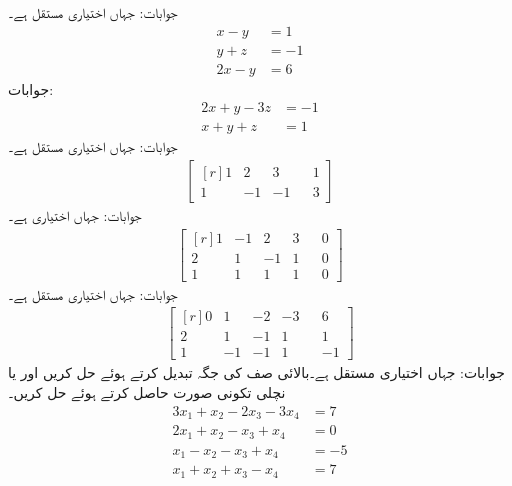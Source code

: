 جوابات:  جہاں  اختیاری مستقل ہے۔
\begin{align*}
x-y&=1\\
y+z&=-1\\
2x-y&=6
\end{align*}
جوابات:
\begin{align*}
2x+y-3z&=-1\\
x+y+z&=1
\end{align*}
جوابات:  جہاں  اختیاری مستقل ہے۔
\begin{align*}
\begin{bmatrix*}[r]
1&2&3&&1\\
1&-1&-1&&3
\end{bmatrix*}
\end{align*}
جوابات:  جہاں  اختیاری ہے۔ 
\begin{align*}
\begin{bmatrix*}[r]
1&-1&2&3&&0\\
2&1&-1&1&&0\\
1&1&1&1&&0
\end{bmatrix*}
\end{align*}
جوابات:  جہاں  اختیاری مستقل ہے۔
\begin{align*}
\begin{bmatrix*}[r]
0&1&-2&-3&&6\\
2&1&-1&1&&1\\
1&-1&-1&1&&-1
\end{bmatrix*}
\end{align*}
جوابات:  جہاں  اختیاری مستقل ہے۔بالائی صف کی جگہ تبدیل کرتے ہوئے حل کریں اور یا نچلی تکونی صورت حاصل کرتے ہوئے حل کریں۔
\begin{align*}
3x_1+x_2-2x_3-3x_4&=7\\
2x_1+x_2-x_3+x_4&=0\\
x_1-x_2-x_3+x_4&=-5\\
x_1+x_2+x_3-x_4&=7
\end{align*}
